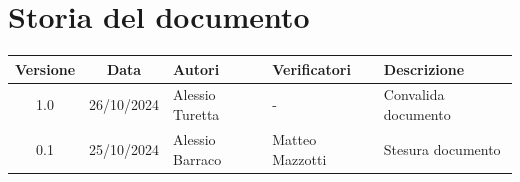 \section{Storia del documento}
\begin{center}
\begin{tabularx}{\textwidth}{ c c p{2.75cm} p{2.75cm} X }
    \rowcolor{gray!20}\rule{0pt}{0.5cm}\textbf{Versione} & \textbf{Data} & \textbf{Autori} & \textbf{Verificatori} & \textbf{Descrizione} \\[0.7ex]
    \hline
    \rule{0pt}{0.5cm}1.0 & 26/10/2024 & Alessio Turetta & - & Convalida documento \\[0.7ex]
    \hline
    \rule{0pt}{0.5cm}0.1 & 25/10/2024 & Alessio Barraco & Matteo Mazzotti & Stesura documento \\[0.7ex]
\end{tabularx}
\end{center}